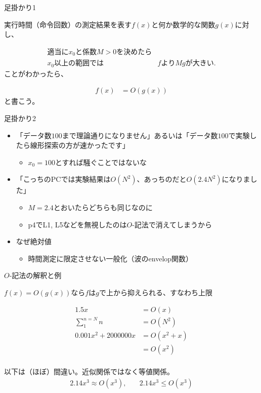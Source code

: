 \documentclass{beamer}
\begin{document}
\begin{frame}[fragile]{足掛かり1}{}

実行時間（命令回数）の測定結果を表す$f(x)$と何か数学的な関数$g(x)$に対し、

\begin{align*}
適当に x_{0}と係数M > 0を決めたら & \\
x_{0}以上の範囲では& fより M g が大きい.
\end{align*}
ことがわかったら、

\begin{align*}
f(x) &= O(g(x))
\end{align*}
と書こう。
\end{frame}

\begin{frame}[fragile]{足掛かり2}{}

\begin{itemize}\itemsep20pt
\item 「データ数$100$まで理論通りになりません」あるいは「データ数$100$で実験したら線形探索の方が速かったです」
\begin{itemize}
\item $x_{0} = 100$とすれば騒ぐことではないな
\end{itemize}
\item 「こっちのPCでは実験結果は$O(N^2)$、あっちのだと$O(2.4N^2)$になりました」
\begin{itemize}
\item $M=2.4$とおいたらどちらも同じなのに
\item p4でL1, L5などを無視したのは$O$-記法で消えてしまうから
\end{itemize}
\item なぜ絶対値
\begin{itemize}%
\item 時間測定に限定させない一般化（波のenvelop関数）
\end{itemize}
\end{itemize}
\end{frame}

\begin{frame}[fragile]{$O$-記法の解釈と例}{}

$f(x) = O(g(x))$なら$f$は$g$で上から抑えられる、すなわち上限

\begin{align*}
1.5 x & = O(x) \\
\sum_{1}^{n=N} n & = O(N^2) \\
0.001x^2 + 2000000x & = O(x^2 + x) \\
         & = O(x^2) \\
\end{align*}

\vfill
以下は（ほぼ）間違い。近似関係ではなく等値関係。
\begin{align*}
2.14x^3 \approx O(x^3), &\quad 2.14x^3 \le O(x^3)
\end{align*}
\end{frame}
\end{document}
